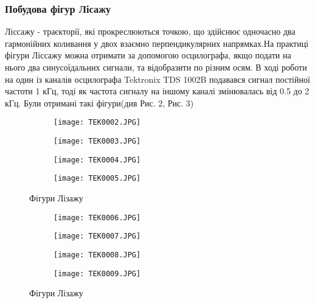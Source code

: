 \documentclass[a4paper,12pt]{article}
\begin{document}
\subsubsection{Побудова фігур Лісажу}
\par{} Ліссажу - траєкторії, які прокреслюються точкою, що здійснює одночасно два гармонійних коливання у двох взаємно перпендикулярних напрямках.На практиці фігури Ліссажу можна отримати за допомогою осцилографа, якщо подати на нього два синусоїдальних сигнали, та відобразити по різним осям.
В ході роботи на один із каналів осцилографа Tektronix TDS 1002B подавався сигнал постійної частоти 1 кГц, тоді як частота сигналу на іншому каналі змінювалась від 0.5 до 2 кГц. Були отримані такі фігури(див Рис. 2, Рис. 3) 
\par\quad\begin{figure}[h!]
  \centering
  \begin{subfigure}[b]{0.4\linewidth}
    \texttt{[image: TEK0002.JPG]}

  \end{subfigure}
  \begin{subfigure}[b]{0.4\linewidth}
    \texttt{[image: TEK0003.JPG]}

  \end{subfigure}
  \begin{subfigure}[b]{0.4\linewidth}
    \texttt{[image: TEK0004.JPG]}

  \end{subfigure}
  \begin{subfigure}[b]{0.4\linewidth}
    \texttt{[image: TEK0005.JPG]}

  \end{subfigure}
    \caption{Фігури Лізажу}
\end{figure}  
\par\quad\begin{figure}[h!]
 \centering
  \begin{subfigure}[b]{0.4\linewidth}
    \texttt{[image: TEK0006.JPG]}
    
  \end{subfigure}
  \begin{subfigure}[b]{0.4\linewidth}
    \texttt{[image: TEK0007.JPG]}

  \end{subfigure}

 
  \begin{subfigure}[b]{0.4\linewidth}
    \texttt{[image: TEK0008.JPG]}

  \end{subfigure}
  \begin{subfigure}[b]{0.4\linewidth}
    \texttt{[image: TEK0009.JPG]}

  \end{subfigure}
  \caption{Фігури Лізажу}
\end{figure}
\end{document}

